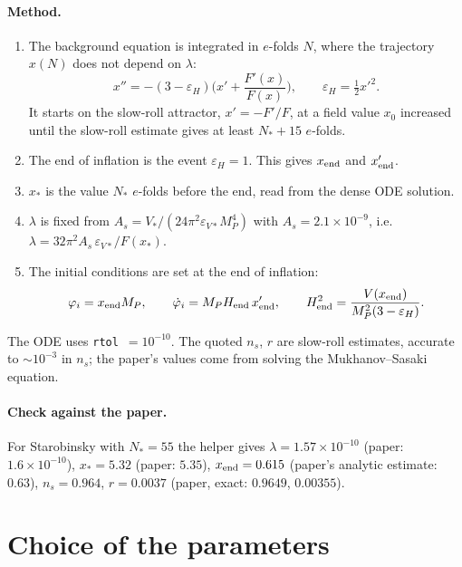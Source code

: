 \documentclass[11pt,a4paper]{article}
\newcommand{\MP}{M_P}
\begin{document}
\paragraph{Method.}
\begin{enumerate}
\item The background equation is integrated in $e$-folds $N$, where the trajectory $x(N)$ does not depend on $\lambda$:
\begin{equation}
x''=-(3-\varepsilon_H)\Big(x'+\frac{F'(x)}{F(x)}\Big),\qquad \varepsilon_H=\tfrac12x'^2 .
\end{equation}
It starts on the slow-roll attractor, $x'=-F'/F$, at a field value $x_0$ increased until the slow-roll estimate gives at least $N_*+15$ $e$-folds.
\item The end of inflation is the event $\varepsilon_H=1$. This gives $x_{\rm end}$ and $x'_{\rm end}$.
\item $x_*$ is the value $N_*$ $e$-folds before the end, read from the dense ODE solution.
\item $\lambda$ is fixed from $A_s=V_*/(24\pi^2\varepsilon_{V*}\MP^4)$ with $A_s=2.1\times10^{-9}$, i.e.\ $\lambda=32\pi^2A_s\,\varepsilon_{V*}/F(x_*)$.
\item The initial conditions are set at the end of inflation:
\begin{equation}
\varphi_i=x_{\rm end}\MP,\qquad
\dot\varphi_i=\MP H_{\rm end}\,x'_{\rm end},\qquad
H_{\rm end}^2=\frac{V(x_{\rm end})}{\MP^2(3-\varepsilon_H)} .
\end{equation}
\end{enumerate}
The ODE uses \texttt{rtol}~$=10^{-10}$. The quoted $n_s$, $r$ are slow-roll estimates, accurate to $\sim10^{-3}$ in $n_s$; the paper's values come from solving the Mukhanov--Sasaki equation.

\paragraph{Check against the paper.} For Starobinsky with $N_*=55$ the helper gives $\lambda=1.57\times10^{-10}$ (paper: $1.6\times10^{-10}$), $x_*=5.32$ (paper: $5.35$), $x_{\rm end}=0.615$ (paper's analytic estimate: $0.63$), $n_s=0.964$, $r=0.0037$ (paper, exact: $0.9649$, $0.00355$).

\section{Choice of the parameters}
\label{sec:params}
\end{document}
